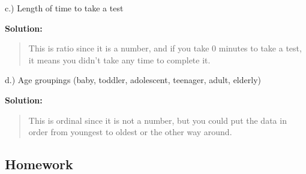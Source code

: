 \documentclass[]{book}
\begin{document}
c.) Length of time to take a test

\textbf{Solution:}

\begin{quote}
This is ratio since it is a number, and if you take 0 minutes to take a test, it means you didn't take any time to complete it.
\end{quote}

d.) Age groupings (baby, toddler, adolescent, teenager, adult, elderly)

\textbf{Solution:}

\begin{quote}
This is ordinal since it is not a number, but you could put the data in order from youngest to oldest or the other way around.
\end{quote}

\hypertarget{homework}{%
\subsection{Homework}\label{homework}}
\end{document}
